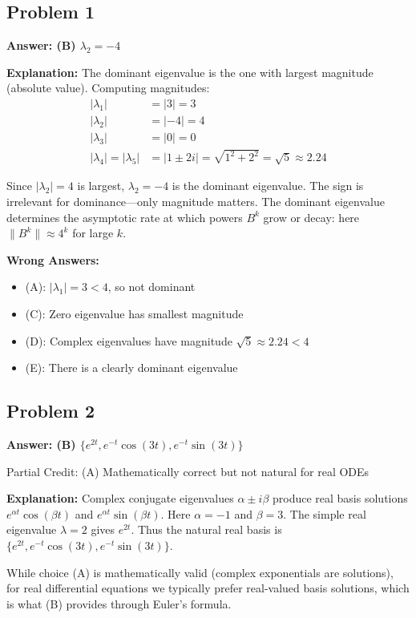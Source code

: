 \documentclass[12pt]{amsart}
\newcommand{\correct}[1]{{\color{correctgreen}\textbf{#1}}}
\newcommand{\partcred}[1]{{\color{partialblue}#1}}
\begin{document}
\subsection*{Problem 1}
\correct{Answer: (B) $\lambda_2 = -4$}

\textbf{Explanation:} The dominant eigenvalue is the one with largest magnitude (absolute value). Computing magnitudes:
\begin{align*}
|\lambda_1| &= |3| = 3\\
|\lambda_2| &= |-4| = 4\\
|\lambda_3| &= |0| = 0\\
|\lambda_4| = |\lambda_5| &= |1 \pm 2i| = \sqrt{1^2 + 2^2} = \sqrt{5} \approx 2.24
\end{align*}

Since $|\lambda_2| = 4$ is largest, $\lambda_2 = -4$ is the dominant eigenvalue. The sign is irrelevant for dominance—only magnitude matters. The dominant eigenvalue determines the asymptotic rate at which powers $B^k$ grow or decay: here $\|B^k\| \approx 4^k$ for large $k$.

\textbf{Wrong Answers:}
\begin{itemize}
\item (A): $|\lambda_1| = 3 < 4$, so not dominant
\item (C): Zero eigenvalue has smallest magnitude
\item (D): Complex eigenvalues have magnitude $\sqrt{5} \approx 2.24 < 4$
\item (E): There is a clearly dominant eigenvalue
\end{itemize}

\subsection*{Problem 2}
\correct{Answer: (B) $\{e^{2t}, e^{-t}\cos(3t), e^{-t}\sin(3t)\}$}

\partcred{Partial Credit: (A) Mathematically correct but not natural for real ODEs}

\textbf{Explanation:} Complex conjugate eigenvalues $\alpha \pm i\beta$ produce real basis solutions $e^{\alpha t}\cos(\beta t)$ and $e^{\alpha t}\sin(\beta t)$. Here $\alpha = -1$ and $\beta = 3$. The simple real eigenvalue $\lambda = 2$ gives $e^{2t}$. Thus the natural real basis is $\{e^{2t}, e^{-t}\cos(3t), e^{-t}\sin(3t)\}$.

While choice (A) is mathematically valid (complex exponentials are solutions), for real differential equations we typically prefer real-valued basis solutions, which is what (B) provides through Euler's formula.
\end{document}
